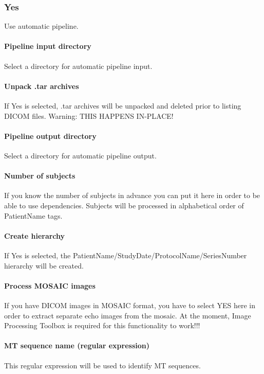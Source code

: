\subsubsection{Yes}
Use automatic pipeline.


\paragraph{Pipeline input directory}
Select a directory for automatic pipeline input.


\paragraph{Unpack .tar archives}
If Yes is selected, .tar archives will be unpacked and deleted prior to listing DICOM files. Warning: THIS HAPPENS IN-PLACE!


\paragraph{Pipeline output directory}
Select a directory for automatic pipeline output.


\paragraph{Number of subjects}
If you know the number of subjects in advance you can put it here in order to be able to use dependencies. Subjects will be processed in alphabetical order of PatientName tags.


\paragraph{Create hierarchy}
If Yes is selected, the PatientName/StudyDate/ProtocolName/SeriesNumber hierarchy will be created.


\paragraph{Process MOSAIC images}
If you have DICOM images in MOSAIC format, you have to select YES here in order to extract separate echo images from the mosaic. At the moment, Image Processing Toolbox is required for this functionality to work!!!


\paragraph{MT sequence name (regular expression)}
This regular expression will be used to identify MT sequences.


